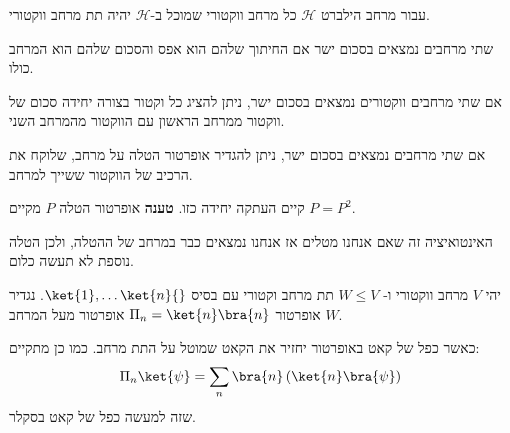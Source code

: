 \documentclass{tstextbook}
\begin{document}
\begin{definition}
עבור מרחב הילברט \(\mathcal{H}\) כל מרחב ווקטורי שמוכל ב-\(\mathcal{H}\) יהיה תת מרחב ווקטורי.

\end{definition}
\begin{definition}
שתי מרחבים נמצאים בסכום ישר אם החיתוך שלהם הוא אפס והסכום שלהם הוא המרחב כולו.

\end{definition}
\begin{proposition}
אם שתי מרחבים ווקטורים נמצאים בסכום ישר, ניתן להציג כל וקטור בצורה יחידה סכום של ווקטור ממרחב הראשון עם הווקטור מהמרחב השני.

\end{proposition}
\begin{definition}
אם שתי מרחבים נמצאים בסכום ישר, ניתן להגדיר אופרטור הטלה על מרחב, שלוקח את הרכיב של הווקטור ששייך למרחב.

\end{definition}
קיים העתקה יחידה כזו.
\textbf{טענה}
אופרטור הטלה \(P\) מקיים \(P=P^2\).

\begin{remark}
האינטואיציה זה שאם אנחנו מטלים אז אנחנו נמצאים כבר במרחב של ההטלה, ולכן הטלה נוספת לא תעשה כלום.

\end{remark}
\begin{definition}
יהי \(V\) מרחב ווקטורי ו- \(W\leq V\) תת מרחב וקטורי עם בסיס \(\ket{1},\dots \ket{n}{}\). 
נגדיר אופרטור \(\Pi_{n}= \ket{n}\bra{n}\) אופרטור מעל המרחב \(W\).

\end{definition}
כאשר כפל של קאט באופרטור יחזיר את הקאט שמוטל על התת מרחב. כמו כן מתקיים:
$$\Pi_{n}\ket{\psi} =\sum_{n}\bra{n} \left( \ket{n} \bra{\psi}  \right)$$
שזה למעשה כפל של קאט בסקלר.
\end{document}
